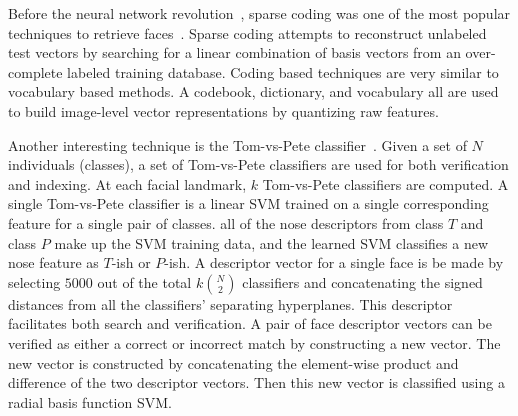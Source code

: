         Before the neural network
          revolution~\cite{krizhevsky_imagenet_2012}, sparse coding was
          one of the most popular techniques to retrieve
          faces~\cite{aharon_ksvd_2006, wright_robust_2009,
          zhang_sparse_2011, jiang_label_2013}.
        Sparse coding attempts to reconstruct unlabeled test vectors by
          searching for a linear combination of basis vectors from an
          over-complete labeled training database.
        Coding based techniques are very similar to vocabulary based
          methods.
        A codebook, dictionary, and vocabulary all are used to build
          image-level vector representations by quantizing raw features.


        Another interesting technique is the Tom-vs-Pete
          classifier~\cite{berg_tomvspete_2012}.
        Given a set of $N$ individuals (classes), a set of Tom-vs-Pete
          classifiers are used for both verification and indexing.
        At each facial landmark, $k$ Tom-vs-Pete classifiers are
          computed.
        A single Tom-vs-Pete classifier is a linear SVM trained on a
          single corresponding feature for a single pair of classes.
        \Eg{} all of the nose descriptors from class $T$ and class $P$
          make up the SVM training data, and the learned SVM classifies a
          new nose feature as $T$-ish or $P$-ish.
        A descriptor vector for a single face is be made by selecting
          $5000$ out of the total $k\binom{N}{2}$ classifiers and
          concatenating the signed distances from all the classifiers'
          separating hyperplanes.
        This descriptor facilitates both search and verification.
        A pair of face descriptor vectors can be verified as either a
          correct or incorrect match by constructing a new vector.
        The new vector is constructed by concatenating the element-wise
          product and difference of the two descriptor vectors.
        Then this new vector is classified using a radial basis function
          SVM{}.

